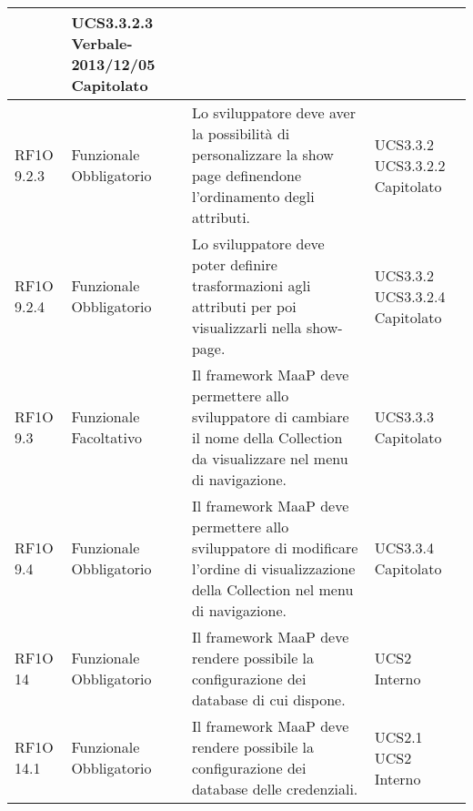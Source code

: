 \begin{center}
\begin{longtable}{ | l | p{2cm} | p{5cm} | p{1.7cm} |}
 &  UCS3.3.2.3 \newline  Verbale-2013/12/05 \newline  Capitolato \newline  \\ \hline      
        RF1O 9.2.3 & Funzionale \newline  Obbligatorio  & Lo sviluppatore deve aver la possibilità di personalizzare la show page definendone l'ordinamento degli attributi. &  UCS3.3.2 \newline  UCS3.3.2.2 \newline  Capitolato \newline  \\ \hline      
        RF1O 9.2.4 & Funzionale \newline  Obbligatorio  & Lo sviluppatore deve poter definire trasformazioni agli attributi per poi visualizzarli nella show-page. &  UCS3.3.2 \newline  UCS3.3.2.4 \newline  Capitolato \newline  \\ \hline      
        RF1O 9.3 & Funzionale \newline  Facoltativo  & Il framework MaaP deve permettere allo sviluppatore di cambiare il nome della Collection da visualizzare nel menu di navigazione. &  UCS3.3.3 \newline  Capitolato \newline  \\ \hline      
        RF1O 9.4 & Funzionale \newline  Obbligatorio  & Il framework MaaP deve permettere allo sviluppatore di modificare l'ordine di visualizzazione della Collection nel menu di navigazione. &  UCS3.3.4 \newline  Capitolato \newline  \\ \hline      
        RF1O 14 & Funzionale \newline  Obbligatorio  & Il framework MaaP deve rendere possibile la configurazione dei database di cui dispone. &  UCS2 \newline  Interno \newline  \\ \hline      
        RF1O 14.1 & Funzionale \newline  Obbligatorio  & Il framework MaaP deve rendere possibile la configurazione dei database delle credenziali. &  UCS2.1 \newline  UCS2 \newline  Interno \newline  \\ \hline      

\end{longtable}
\end{center}
